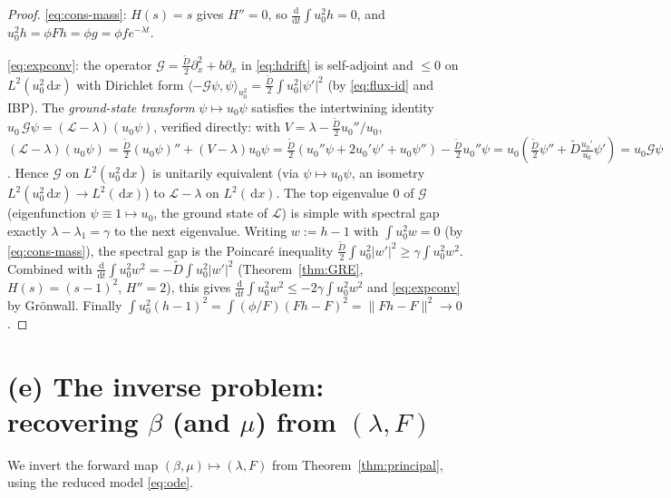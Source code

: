\documentclass{amsart}
\theoremstyle{definition}
\newcommand{\dd}{\,\mathrm{d}}
\begin{document}
\begin{proof}
\eqref{eq:cons-mass}: $H(s)=s$ gives $H''=0$, so $\frac{\mathrm d}{\mathrm dt}\int u_0^2 h=0$,
and $u_0^2 h=\phi F h=\phi g=\phi f e^{-\lambda t}$.

\eqref{eq:expconv}: the operator $\mathcal G=\frac{\widetilde D}{2}\partial_x^2+b\partial_x$ in
\eqref{eq:hdrift} is self-adjoint and $\le0$ on $L^2(u_0^2\dd x)$ with Dirichlet form
$\langle-\mathcal G\psi,\psi\rangle_{u_0^2}=\frac{\widetilde D}{2}\int u_0^2|\psi'|^2$ (by
\eqref{eq:flux-id} and IBP). The \emph{ground-state transform} $\psi\mapsto u_0\psi$ satisfies
the intertwining identity
$u_0\,\mathcal G\psi=(\mathcal L-\lambda)(u_0\psi)$, verified directly: with $V=\lambda-\frac{\widetilde D}{2}u_0''/u_0$,
$(\mathcal L-\lambda)(u_0\psi)=\frac{\widetilde D}{2}(u_0\psi)''+(V-\lambda)u_0\psi
=\frac{\widetilde D}{2}(u_0''\psi+2u_0'\psi'+u_0\psi'')-\frac{\widetilde D}{2}u_0''\psi
=u_0(\frac{\widetilde D}{2}\psi''+\widetilde D\frac{u_0'}{u_0}\psi')=u_0\mathcal G\psi$.
Hence $\mathcal G$ on $L^2(u_0^2\dd x)$ is unitarily equivalent (via $\psi\mapsto u_0\psi$, an
isometry $L^2(u_0^2\dd x)\to L^2(\dd x)$) to $\mathcal L-\lambda$ on $L^2(\dd x)$. The top
eigenvalue $0$ of $\mathcal G$ (eigenfunction $\psi\equiv1\mapsto u_0$, the ground state of
$\mathcal L$) is simple with spectral gap exactly $\lambda-\lambda_1=\gamma$ to the next
eigenvalue. Writing $w:=h-1$ with $\int u_0^2 w=0$ (by \eqref{eq:cons-mass}), the spectral gap
is the Poincar\'e inequality
$\frac{\widetilde D}{2}\int u_0^2|w'|^2\ge\gamma\int u_0^2 w^2$. Combined with
$\frac{\mathrm d}{\mathrm dt}\int u_0^2 w^2=-\widetilde D\int u_0^2|w'|^2$
(Theorem~\ref{thm:GRE}, $H(s)=(s-1)^2$, $H''=2$), this gives
$\frac{\mathrm d}{\mathrm dt}\int u_0^2 w^2\le-2\gamma\int u_0^2 w^2$ and \eqref{eq:expconv} by
Gr\"onwall. Finally $\int u_0^2(h-1)^2=\int(\phi/F)(Fh-F)^2=\|Fh-F\|^2\to0$.
\end{proof}

\section{(e) The inverse problem: recovering $\beta$ (and $\mu$) from $(\lambda,F)$}

We invert the forward map $(\beta,\mu)\mapsto(\lambda,F)$ from Theorem~\ref{thm:principal},
using the reduced model \eqref{eq:ode}.
\end{document}
